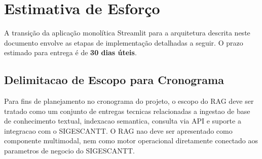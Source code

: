 \documentclass[12pt, a4paper]{article}
\begin{document}
\section{Estimativa de Esforço}

A transição da aplicação monolítica Streamlit para a arquitetura descrita neste documento envolve as etapas de implementação detalhadas a seguir. O prazo estimado para entrega é de \textbf{30 dias úteis}.

\subsection{Delimitacao de Escopo para Cronograma}

Para fins de planejamento no cronograma do projeto, o escopo do RAG deve ser tratado como um conjunto de entregas tecnicas relacionadas a ingestao de base de conhecimento textual, indexacao semantica, consulta via API e suporte a integracao com o SIGESCANTT. O RAG nao deve ser apresentado como componente multimodal, nem como motor operacional diretamente conectado aos parametros de negocio do SIGESCANTT.
\end{document}
